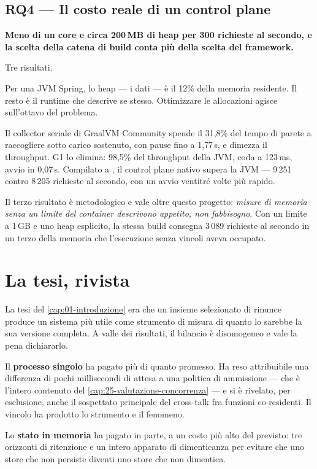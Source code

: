 \subsection{RQ4 --- Il costo reale di un control plane}

\textbf{Meno di un core e circa 200\,MB di heap per 300 richieste al secondo, e
la scelta della catena di build conta pi\`u della scelta del framework.}

Tre risultati.

Per una JVM Spring, lo heap --- i dati --- \`e il 12\% della memoria residente. Il
resto \`e il runtime che descrive se stesso. Ottimizzare le allocazioni agisce
sull'ottavo del problema.

Il collector seriale di GraalVM Community spende il 31{,}8\% del tempo di parete
a raccogliere sotto carico sostenuto, con pause fino a 1{,}77\,s, e dimezza il
throughput. G1 lo elimina: 98{,}5\% del throughput della JVM, coda a 123\,ms,
avvio in 0{,}07\,s. Compilato a , il control plane nativo supera la
JVM --- 9\,251 contro 8\,205 richieste al secondo, con un avvio ventitr\'e volte
pi\`u rapido.

Il terzo risultato \`e metodologico e vale oltre questo progetto: \emph{misure di
memoria senza un limite del container descrivono appetito, non fabbisogno}. Con
un limite a 1\,GB e uno heap esplicito, la stessa build consegna 3\,089
richieste al secondo in un terzo della memoria che l'esecuzione senza vincoli
aveva occupato.

\section{La tesi, rivista}

La tesi del \cref{cap:01-introduzione} era che un insieme selezionato di rinunce
produce un sistema pi\`u utile come strumento di misura di quanto lo sarebbe la
sua versione completa. A valle dei risultati, il bilancio \`e disomogeneo e vale
la pena dichiararlo.

Il \textbf{processo singolo} ha pagato pi\`u di quanto promesso. Ha reso
attribuibile una differenza di pochi millisecondi di attesa a una politica di
ammissione --- che \`e l'intero contenuto del \cref{cap:25-valutazione-concorrenza}
--- e si \`e rivelato, per esclusione, anche il sospettato principale del
cross-talk fra funzioni co-residenti. Il vincolo ha prodotto lo strumento e il
fenomeno.

Lo \textbf{stato in memoria} ha pagato in parte, a un costo pi\`u alto del
previsto: tre orizzonti di ritenzione e un intero apparato di dimenticanza per
evitare che uno store che non persiste diventi uno store che non dimentica.

